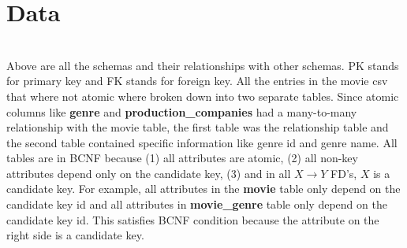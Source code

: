 \documentclass[11pt]{article}
\begin{document}
\section{Data}

	\vspace{2cm}\\

	Above are all the schemas and their relationships with other schemas.
	PK stands for primary key and FK stands for foreign key. All the
	entries in the movie csv that where not atomic where broken down into
	two separate tables. Since atomic columns like \textbf{genre} and
	\textbf{production\_companies} had a many-to-many relationship with the
	movie table, the first table was the relationship table and the
	second table contained specific information like genre id and genre
	name. All tables are in BCNF because (1) all attributes are atomic, (2)
	all non-key attributes depend only on the candidate key, (3)
	and in all $X \rightarrow Y$ FD's, $X$ is a candidate key. For example,
	all attributes in the \textbf{movie} table only depend on the
	candidate key id and all attributes in  \textbf{movie\_genre} table
	only depend on the candidate key id. This satisfies BCNF condition
	because the attribute on the right side is a candidate key.

\pagebreak
\end{document}
